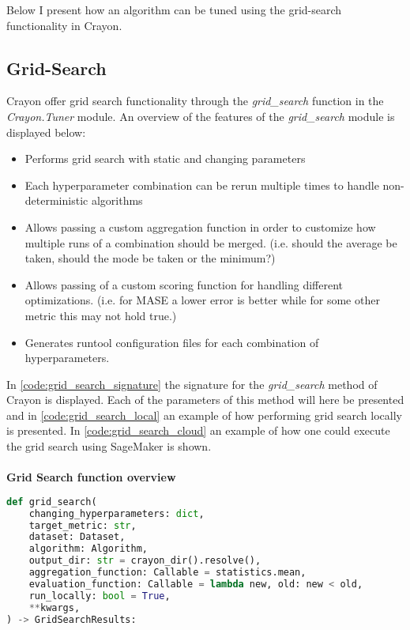 Below I present how an algorithm can be tuned using the grid-search functionality in Crayon.

\subsection{Grid-Search}
Crayon offer grid search functionality through the \textit{grid\_search} function in the \textit{Crayon.Tuner} module.
An overview of the features of the \textit{grid\_search} module is displayed below:

\begin{itemize}
    \item Performs grid search with static and changing parameters
    \item Each hyperparameter combination can be rerun multiple times to handle non-deterministic algorithms
    \item Allows passing a custom aggregation function in order to customize how multiple runs of a combination should be merged. (i.e. should the average be taken, should the mode be taken or the minimum?)
    \item Allows passing of a custom scoring function for handling different optimizations. (i.e. for MASE a lower error is better while for some other metric this may not hold true.)
    \item Generates runtool configuration files for each combination of hyperparameters.
\end{itemize}

In \ref{code:grid_search_signature} the signature for the \textit{grid\_search} method of Crayon is displayed. Each of the parameters of this method will here be presented and in \ref{code:grid_search_local} an example of how performing grid search locally is presented. In \ref{code:grid_search_cloud} an example of how one could execute the grid search using SageMaker is shown.
\\
\\
\textbf{Grid Search function overview}
\\
\begin{lstlisting}[language=Python, label={code:grid_search_signature}, caption=Parameters of the grid search functionality in Crayon.]
def grid_search(
    changing_hyperparameters: dict,
    target_metric: str,
    dataset: Dataset,
    algorithm: Algorithm,
    output_dir: str = crayon_dir().resolve(),
    aggregation_function: Callable = statistics.mean,
    evaluation_function: Callable = lambda new, old: new < old,
    run_locally: bool = True,
    **kwargs,
) -> GridSearchResults:
\end{lstlisting}

